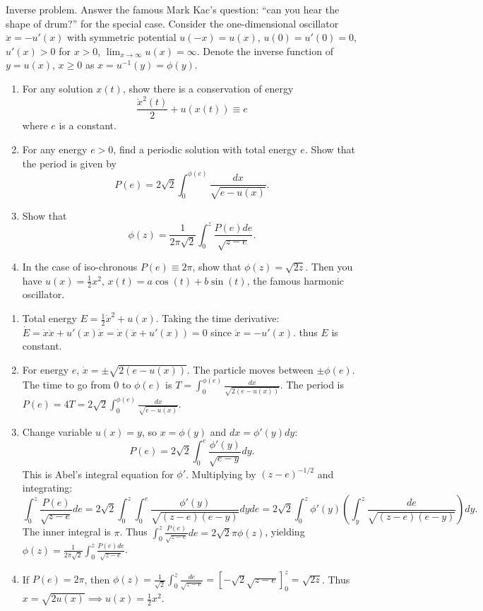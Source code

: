 \begin{exercise}
\label{applied:2016:7}
Inverse problem. Answer the famous Mark Kac's question: ``can you hear the shape of drum?'' for the special case.
Consider the one-dimensional oscillator $\ddot{x} = -u'(x)$ with symmetric potential $u(-x) = u(x)$, $u(0) = u'(0) = 0$, $u'(x) > 0$ for $x > 0$, $\lim_{x \to \infty} u(x) = \infty$. Denote the inverse function of $y = u(x)$, $x \geq 0$ as $x = u^{-1}(y) = \phi(y)$.
\begin{enumerate}
    \item[(a)] For any solution $x(t)$, show there is a conservation of energy
    \[
    \frac{\dot{x}^2(t)}{2} + u(x(t)) \equiv e
    \]
    where $e$ is a constant.
    \item[(b)] For any energy $e > 0$, find a periodic solution with total energy $e$. Show that the period is given by
    \[
    P(e) = 2\sqrt{2} \int_0^{\phi(e)} \frac{dx}{\sqrt{e - u(x)}}.
    \]
    \item[(c)] Show that
    \[
    \phi(z) = \frac{1}{2\pi\sqrt{2}} \int_0^z \frac{P(e) de}{\sqrt{z - e}}.
    \]
    \item[(d)] In the case of iso-chronous $P(e) \equiv 2\pi$, show that $\phi(z) = \sqrt{2z}$. Then you have $u(x) = \frac{1}{2}x^2$, $x(t) = a\cos(t) + b\sin(t)$, the famous harmonic oscillator.
\end{enumerate}
\end{exercise}

\begin{solution}
\begin{enumerate}
    \item[(a)] Total energy $E = \frac{1}{2}\dot{x}^2 + u(x)$. Taking the time derivative: $\dot{E} = \dot{x}\ddot{x} + u'(x)\dot{x} = \dot{x}(\ddot{x} + u'(x)) = 0$ since $\ddot{x} = -u'(x)$. thus $E$ is constant.
    \item[(b)] For energy $e$, $\dot{x} = \pm\sqrt{2(e-u(x))}$. The particle moves between $\pm \phi(e)$. The time to go from $0$ to $\phi(e)$ is $T = \int_0^{\phi(e)} \frac{dx}{\sqrt{2(e-u(x))}}$. The period is $P(e) = 4T = 2\sqrt{2} \int_0^{\phi(e)} \frac{dx}{\sqrt{e - u(x)}}$.
    \item[(c)] Change variable $u(x) = y$, so $x = \phi(y)$ and $dx = \phi'(y) dy$:
    \[ P(e) = 2\sqrt{2} \int_0^e \frac{\phi'(y)}{\sqrt{e-y}} dy. \]
    This is Abel's integral equation for $\phi'$. Multiplying by $(z-e)^{-1/2}$ and integrating:
    \[ \int_0^z \frac{P(e)}{\sqrt{z-e}} de = 2\sqrt{2} \int_0^z \int_0^e \frac{\phi'(y)}{\sqrt{(z-e)(e-y)}} dy de = 2\sqrt{2} \int_0^z \phi'(y) \left( \int_y^z \frac{de}{\sqrt{(z-e)(e-y)}} \right) dy. \]
    The inner integral is $\pi$. Thus $\int_0^z \frac{P(e)}{\sqrt{z-e}} de = 2\sqrt{2} \pi \phi(z)$, yielding $\phi(z) = \frac{1}{2\pi\sqrt{2}} \int_0^z \frac{P(e) de}{\sqrt{z-e}}$.
    \item[(d)] If $P(e) = 2\pi$, then $\phi(z) = \frac{1}{\sqrt{2}} \int_0^z \frac{de}{\sqrt{z-e}} = [-\sqrt{2}\sqrt{z-e}]_0^z = \sqrt{2z}$. Thus $x = \sqrt{2u(x)} \implies u(x) = \frac{1}{2}x^2$.
\end{enumerate}
\end{solution}

